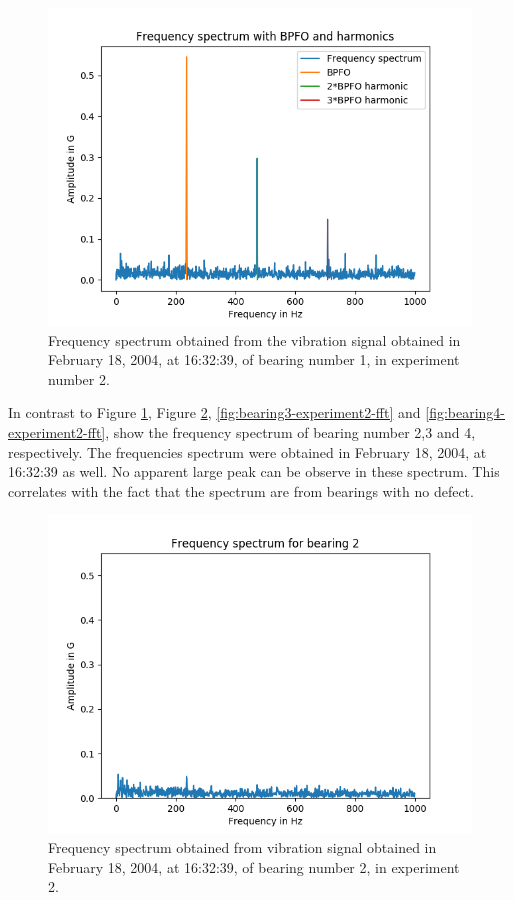 \documentclass[../Main/thesis.tex]{subfiles}
\begin{document}
\begin{figure}[H] 
   \centering
   \includegraphics[width=4.9in]{../fig/experiment2_bearing1_fft.png} 
   \caption{Frequency spectrum obtained from the vibration signal obtained in February 18, 2004, at 16:32:39, of bearing number 1,  in  experiment number 2.}
   \label{fig:bearing1-experiment2-fft}
\end{figure}
\justify
In contrast to Figure \ref{fig:bearing1-experiment2-fft}, Figure \ref{fig:bearing2-experiment2-fft}, \ref{fig:bearing3-experiment2-fft} and \ref{fig:bearing4-experiment2-fft}, show  the frequency spectrum of bearing number 2,3 and 4, respectively. The frequencies spectrum were obtained in February 18, 2004, at 16:32:39 as well. No apparent large peak can be observe in these spectrum. This correlates with the fact that the spectrum are from bearings with no defect. 
\begin{figure}[H] 
   \centering
   \includegraphics[width=4.9in]{../fig/experiment2_bearing2_fft.png} 
   \caption{Frequency spectrum obtained from vibration signal obtained in February 18, 2004, at 16:32:39, of bearing number 2, in experiment 2.}
   \label{fig:bearing2-experiment2-fft}
\end{figure}
\end{document}
